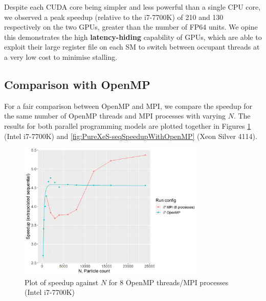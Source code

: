 \documentclass[12pt]{article}
\begin{document}
Despite each CUDA core being simpler and less powerful than a single CPU core, we observed a peak speedup (relative to the i7-7700K) of 210 and 130 respectively on the two GPUs, greater than the number of FP64 units. We opine this demonstrates the high \textbf{latency-hiding} capability of GPUs, which are able to exploit their large register file on each SM to switch between occupant threads at a very low cost to minimise stalling.

\subsection{Comparison with OpenMP}
\label{subsection:omp-vs-mpi}

For a fair comparison between OpenMP and MPI, we compare the speedup for the same number of OpenMP threads and MPI processes with varying $N$. The results for both parallel programming models are plotted together in Figures \ref{fig:PureI7-seqSpeedupWithOpenMP} (Intel i7-7700K) and \ref{fig:PureXeS-seqSpeedupWithOpenMP} (Xeon Silver 4114).\\

\pagebreak

\begin{figure}[H]
    \centering
    \includegraphics[width=0.8\textwidth]{processedCpuResults/PureI7-seqSpeedupWithOpenMP.png}
    \caption{Plot of speedup against $N$ for 8 OpenMP threads/MPI processes (Intel i7-7700K)}
    \label{fig:PureI7-seqSpeedupWithOpenMP}
\end{figure}
\end{document}
